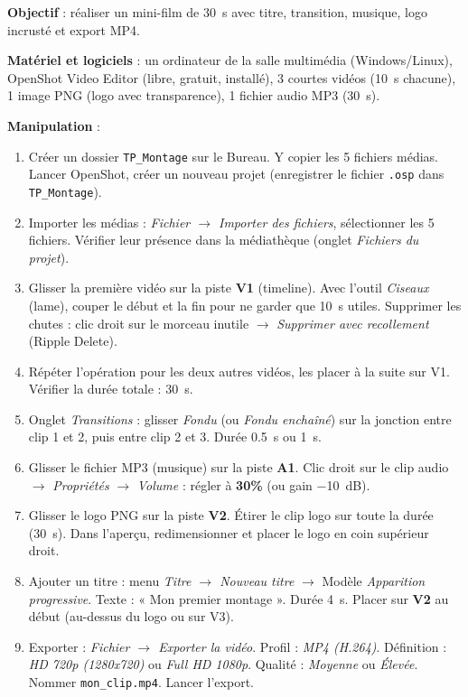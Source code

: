 \documentclass[11pt]{article}
\begin{document}
\begin{experience}
\textbf{Objectif} : réaliser un mini-film de \SI{30}{s} avec titre, transition, musique, logo incrusté et export MP4.

\textbf{Matériel et logiciels} : un ordinateur de la salle multimédia (Windows/Linux), OpenShot Video Editor (libre, gratuit, installé), 3 courtes vidéos (\SI{10}{s} chacune), 1 image PNG (logo avec transparence), 1 fichier audio MP3 (\SI{30}{s}).

\textbf{Manipulation} :
\begin{enumerate}
  \item Créer un dossier \texttt{TP\_Montage} sur le Bureau. Y copier les 5 fichiers médias. Lancer OpenShot, créer un nouveau projet (enregistrer le fichier \texttt{.osp} dans \texttt{TP\_Montage}).
  \item Importer les médias : \emph{Fichier $\rightarrow$ Importer des fichiers}, sélectionner les 5 fichiers. Vérifier leur présence dans la médiathèque (onglet \emph{Fichiers du projet}).
  \item Glisser la première vidéo sur la piste \textbf{V1} (timeline). Avec l'outil \emph{Ciseaux} (lame), couper le début et la fin pour ne garder que \SI{10}{s} utiles. Supprimer les chutes : clic droit sur le morceau inutile $\rightarrow$ \emph{Supprimer avec recollement} (Ripple Delete).
  \item Répéter l'opération pour les deux autres vidéos, les placer à la suite sur V1. Vérifier la durée totale : \SI{30}{s}.
  \item Onglet \emph{Transitions} : glisser \emph{Fondu} (ou \emph{Fondu enchaîné}) sur la jonction entre clip 1 et 2, puis entre clip 2 et 3. Durée \SI{0,5}{s} ou \SI{1}{s}.
  \item Glisser le fichier MP3 (musique) sur la piste \textbf{A1}. Clic droit sur le clip audio $\rightarrow$ \emph{Propriétés} $\rightarrow$ \emph{Volume} : régler à \textbf{30\%} (ou gain \SI{-10}{dB}).
  \item Glisser le logo PNG sur la piste \textbf{V2}. Étirer le clip logo sur toute la durée (\SI{30}{s}). Dans l'aperçu, redimensionner et placer le logo en coin supérieur droit.
  \item Ajouter un titre : menu \emph{Titre $\rightarrow$ Nouveau titre} $\rightarrow$ Modèle \emph{Apparition progressive}. Texte : « Mon premier montage ». Durée \SI{4}{s}. Placer sur \textbf{V2} au début (au-dessus du logo ou sur V3).
  \item Exporter : \emph{Fichier $\rightarrow$ Exporter la vidéo}. Profil : \emph{MP4 (H.264)}. Définition : \emph{HD 720p (1280x720)} ou \emph{Full HD 1080p}. Qualité : \emph{Moyenne} ou \emph{Élevée}. Nommer \texttt{mon\_clip.mp4}. Lancer l'export.
\end{enumerate}


\end{experience}
\end{document}
